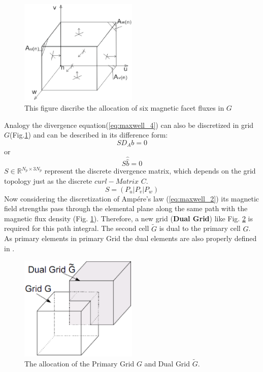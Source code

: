 \begin{figure}
\centering
\includegraphics[width=0.5\textwidth]{bilder/divergence_in_grid}
\caption{This figure discribe the allocation of six magnetic facet fluxes in $G$}
\label{fig:divergence_G}
\end{figure}
Analogy the divergence equation(\ref{eq:maxwell_4}) can also be discretized in grid $G$(Fig.\ref{fig:divergence_G}) and can be described in its difference form: 
\begin{equation}
SD_{A}b=0
\label{eq:divergence_sample}
\end{equation}
or
\begin{equation}
S\widehat{\widehat{b}}=0
\label{eq:divergence_integral}
\end{equation}
$S\in \mathbb{R}^{N_{p}\times 3N_{p}}$ represent the discrete divergence matrix, which depends on the grid topology just as the discrete $curl-Matrix$ $C$.
\begin{equation}
S=(P_{u}|P_{v}|P_{w})
\label{eq:S_matrix}
\end{equation}
Now considering the discretization of Amp\'ere's law (\ref{eq:maxwell_2}) its magnetic field strengths pass through the elemental plane along the same path with the magnetic flux density (Fig. \ref{fig:divergence_G}). Therefore, a new grid (\textbf{Dual Grid}) like Fig. \ref{fig:dual_grid} is required for this path integral. The second cell $\tilde{G}$ is dual to the primary cell $G$. As primary elements in primary Grid the dual elements are also properly defined in \cite{script_FeldSim}.
\begin{figure}[!ht]
\centering
\includegraphics[width=0.5\textwidth]{bilder/dual_grid}
\caption{The allocation of the Primary Grid $G$ and Dual Grid $\tilde{G}$\cite{FIT_discrete_electrommagnetism}.}
\label{fig:dual_grid}
\end{figure}
